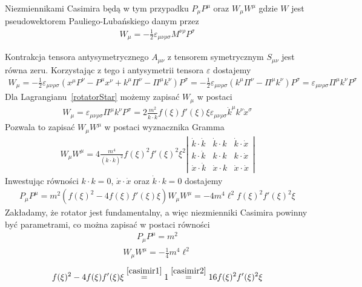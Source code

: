 Niezmiennikami Casimira będą w tym przypadku $P_\mu P^\mu$ oraz
$W_\mu W^\mu$ gdzie $W$ jest pseudowektorem Pauliego-Lubańskiego 
danym przez
\begin{align}
W_\mu = - \frac{1}{2} \varepsilon_{\mu\nu\rho\sigma}
M^{\nu\rho} P^\sigma
\end{align}

Kontrakcja tensora antysymetrycznego $A_{\mu\nu}$ z 
tensorem symetrycznym $S_{\mu\nu}$ jest równa zeru. 
Korzystając z tego i antysymetrii tensora $\varepsilon$ dostajemy
\begin{align}
W_\mu = - \frac{1}{2} \varepsilon_{\mu\nu\rho\sigma}
(x^\mu P^\nu - P^\mu x^\nu + k^\mu \Pi^\nu - \Pi^\mu k^\nu) P^\sigma = 
 - \frac{1}{2} \varepsilon_{\mu\nu\rho\sigma}
( k^\mu \Pi^\nu - \Pi^\mu k^\nu) P^\sigma = 
  \varepsilon_{\mu\nu\rho\sigma}
 \Pi^\mu k^\nu P^\sigma
\end{align}
Dla Lagrangianu~\ref{rotatorStar} możemy zapisać $W_\mu$ w postaci
\begin{align}
W_\mu =  \varepsilon_{\mu\nu\rho\sigma}  \Pi^\mu k^\nu P^\sigma =
2\frac{m^2}{ \dot{k} \cdot \dot{k}} 
f(\xi) f'(\xi) \xi \varepsilon_{\mu\nu\rho\sigma} 
 \dot{k}^\mu k^\nu \dot{x}^\sigma
\end{align}
Pozwala to zapisać $W_\mu W^\mu$ w postaci wyznacznika Gramma
\begin{align}
W_\mu W^\mu = 
4 \frac{m^4}{ (\dot{k} \cdot \dot{k})^2} 
f(\xi)^2 f'(\xi)^2 \xi^2 
\left| 
\begin{array}{ccc}
\dot{k} \cdot \dot{k}& \dot{k} \cdot k& \dot{k} \cdot \dot{x}\\
k \cdot \dot{k}& k \cdot k &k  \cdot \dot{x}\\
\dot{x} \cdot \dot{k}& \dot{x} \cdot k &\dot{x} \cdot \dot{x}
\end{array}
\right|
\end{align}
Inwestując równości $k\cdot k=0$, $\dot{x}\cdot\dot{x}$ 
oraz $\dot{k} \cdot k= 0$ dostajemy
\begin{align}
P_\mu P^\mu =  m^2( f(\xi)^2- 4 f(\xi) f'(\xi) \xi)
W_\mu W^\mu = 
 - 4 m^4\ell^2  f(\xi)^2 f'(\xi)^2 \xi
\end{align}
Zakładamy, że rotator jest fundamentalny, a więc niezmienniki
Casimira powinny być parametrami, co można zapisać w postaci
równości
\begin{align} \label{casimir1}
P_\mu P^\mu = m^2 \tag{C1}
\end{align}
\begin{align} \label{casimir2}
W_\mu W^\mu = - \frac{1}{4} m^4 \ell^2\tag{C2}
\end{align}
\begin{align} 
 f(\xi)^2- 4 f(\xi) f'(\xi) \xi
\stackrel{\ref{casimir1}}{=} 1 \stackrel{\ref{casimir2}}{=}
  16   f(\xi)^2 f'(\xi)^2 \xi
\end{align}



